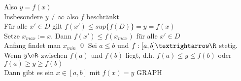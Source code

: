 Also $y = f(x)$\\
Insbesondere $y \neq \infty$ also $f$ beschränkt\\
Für alle $x' \in D$ gilt $f(x') \leq sup \{f(D)\} = y = f(x)$\\
Setze $x_{max} := x$. Dann $f(x') \leq f(x_{max})$ für alle $x' \in D$\\
Anfang findet man $x_{min}$ \qed
{}
Sei $a\leq b$ und $f:[a,b]→\R$ stetig.\\
Wenn $y\eR$ zwischen $f(a)$ und $f(b)$  liegt, d.h. $f(a)\leq y \leq f(b)$ oder $f(a)\geq y \geq f(b)$\\
Dann gibt es ein $x\in[a,b]$ mit $f(x)=y$ GRAPH\\